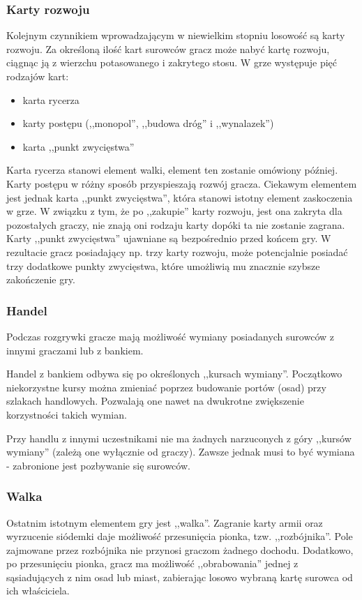 \documentclass[a4paper,12pt]{article}
\begin{document}
\subsubsection{Karty rozwoju}
Kolejnym czynnikiem wprowadzającym w niewielkim stopniu losowość są
karty rozwoju. Za określoną ilość kart surowców gracz może nabyć kartę
rozwoju, ciągnąc ją z wierzchu potasowanego i zakrytego stosu. W grze
występuje pięć rodzajów kart:

\begin{itemize}
\item karta rycerza
\item karty postępu (,,monopol'', ,,budowa dróg'' i ,,wynalazek'')
\item karta ,,punkt zwycięstwa''
\end{itemize}

Karta rycerza stanowi element walki, element ten zostanie omówiony
później. Karty postępu w różny sposób przyspieszają rozwój
gracza. Ciekawym elementem jest jednak karta ,,punkt zwycięstwa'',
która stanowi istotny element zaskoczenia w grze. W związku z tym, że
po ,,zakupie'' karty rozwoju, jest ona zakryta dla pozostałych graczy,
nie znają oni rodzaju karty dopóki ta nie zostanie zagrana. Karty
,,punkt zwycięstwa'' ujawniane są bezpośrednio przed końcem gry. W
rezultacie gracz posiadający np. trzy karty rozwoju, może potencjalnie
posiadać trzy dodatkowe punkty zwycięstwa, które umożliwią mu znacznie
szybsze zakończenie gry.

\subsubsection{Handel}
Podczas rozgrywki gracze mają możliwość wymiany posiadanych surowców z
innymi graczami lub z bankiem.

Handel z bankiem odbywa się po określonych ,,kursach
wymiany''. Początkowo niekorzystne kursy można zmieniać poprzez
budowanie portów (osad) przy szlakach handlowych. Pozwalają one nawet
na dwukrotne zwiększenie korzystności takich wymian.

Przy handlu z innymi uczestnikami nie ma żadnych narzuconych z góry
,,kursów wymiany'' (zależą one wyłącznie od graczy). Zawsze jednak
musi to być wymiana - zabronione jest pozbywanie się surowców.

\subsubsection{Walka}
Ostatnim istotnym elementem gry jest ,,walka''. Zagranie karty armii
oraz wyrzucenie siódemki daje możliwość przesunięcia pionka,
tzw. ,,rozbójnika''. Pole zajmowane przez rozbójnika nie przynosi
graczom żadnego dochodu. Dodatkowo, po przesunięciu pionka, gracz ma
możliwość ,,obrabowania'' jednej z sąsiadujących z nim osad lub miast,
zabierając losowo wybraną kartę surowca od ich właściciela.
\end{document}
